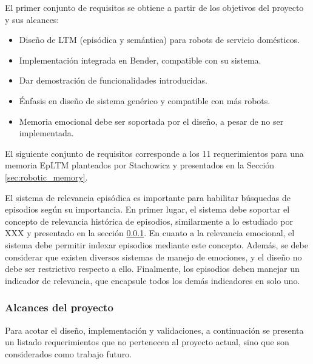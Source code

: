 El primer conjunto de requisitos se obtiene a partir de los objetivos del proyecto y sus alcances:
\begin{itemize}
\item Diseño de LTM (episódica y semántica) para robots de servicio domésticos.
\item Implementación integrada en Bender, compatible con su sistema.
\item Dar demostración de funcionalidades introducidas.
\item Énfasis en diseño de sistema genérico y compatible con más robots.
\item Memoria emocional debe ser soportada por el diseño, a pesar de no ser implementada.
\end{itemize}

El siguiente conjunto de requisitos corresponde a los 11 requerimientos para una memoria EpLTM planteados por Stachowicz\cite{Stachowicz2012} y presentados en la Sección \ref{sec:robotic_memory}. 

El sistema de relevancia episódica es importante para habilitar búsquedas de episodios según su importancia. En primer lugar, el sistema debe soportar el concepto de relevancia histórica de episodios, similarmente a lo estudiado por XXX \cite{} y presentado en la sección \ref{}. En cuanto a la relevancia emocional, el sistema debe permitir indexar episodios mediante este concepto. Además, se debe considerar que existen diversos sistemas de manejo de emociones, y el diseño no debe ser restrictivo respecto a ello. Finalmente, los episodios deben manejar un indicador de relevancia, que encapsule todos los demás indicadores en solo uno.

\subsubsection{Alcances del proyecto}


Para acotar el diseño, implementación y validaciones, a continuación se presenta un listado requerimientos que no pertenecen al proyecto actual, sino que son considerados como trabajo futuro.

